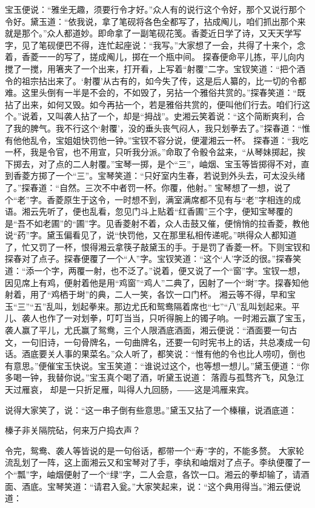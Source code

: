 \documentclass[12pt,oneside]{book}
\begin{document}
宝玉便说：“雅坐无趣，须要行令才好。”众人有的说行这个令好，那个又说行那个令好。黛玉道：“依我说，拿了笔砚将各色全都写了，拈成阄儿，咱们抓出那个来就是那个。”众人都道妙。即命拿了一副笔砚花笺。香菱近日学了诗，又天天学写字，见了笔砚便巴不得，连忙起座说：“我写。”大家想了一会，共得了十来个，念着，香菱一一的写了，搓成阄儿，掷在一个瓶中间。
探春便命平儿拣，平儿向内搅了一搅，用箸夹了一个出来，打开看，上写着“射覆”二字。宝钗笑道：“把个酒令的祖宗拈出来了。‘射覆’从古有的，如今失了传，这是后人纂的，比一切的令都难。这里头倒有一半是不会的，不如毁了，另拈一个雅俗共赏的。”探春笑道：“既拈了出来，如何又毁。如今再拈一个，若是雅俗共赏的，便叫他们行去。咱们行这个。”说着，又叫袭人拈了一个，却是“拇战”。史湘云笑着说：“这个简断爽利，合了我的脾气。我不行这个‘射覆’，没的垂头丧气闷人，我只划拳去了。”探春道：“惟有他他乱令，宝姐姐快罚他一钟。”宝钗不容分说，便灌湘云一杯。
探春道：“我吃一杯，我是令官，也不用宣，只听我分派。”命取了令骰令盆来，“从琴妹掷起，挨下掷去，对了点的二人射覆。”宝琴一掷，是个“三”，岫烟、宝玉等皆掷得不对，直到香菱方掷了一个“三”。宝琴笑道：“只好室内生春，若说到外头去，可太没头绪了。”探春道：“自然。三次不中者罚一杯。你覆，他射。”
宝琴想了一想，说了个“老”字。香菱原生于这令，一时想不到，满室满席都不见有与“老”字相连的成语。湘云先听了，便也乱看，忽见门斗上贴着“红香圃”三个字，便知宝琴覆的是“吾不如老圃”的“圃”字。见香菱射不着，众人击鼓又催，便悄悄的拉香菱，教他说“药”字。黛玉偏看见了，说“快罚他，又在那里私相传递呢。”哄得众人都知道了，忙又罚了一杯，恨得湘云拿筷子敲黛玉的手。于是罚了香菱一杯。下则宝钗和探春对了点子。探春便覆了一个“人”字。宝钗笑道：“这个‘人’字泛的很。”探春笑道：“添一个字，两覆一射，也不泛了。”说着，便又说了一个“窗”字。宝钗一想，因见席上有鸡，便射着他是用“鸡窗”“鸡人”二典了，因射了一个“埘”字。探春知他射着，用了“鸡栖于埘”的典，二人一笑，各饮一口门杯。
湘云等不得，早和宝玉“三”“五”乱叫，划起拳来。那边尤氏和鸳鸯隔着席也“七”“八”乱叫划起来。平儿、袭人也作了一对划拳，叮叮当当，只听得腕上的镯子响。一时湘云赢了宝玉，袭人赢了平儿，尤氏赢了鸳鸯，三个人限酒底酒面，湘云便说：“酒面要一句古文，一句旧诗，一句骨牌名，一句曲牌名，还要一句时宪书上的话，共总凑成一句话。酒底要关人事的果菜名。”众人听了，都笑说：“惟有他的令也比人唠叨，倒也有意思。”便催宝玉快说。宝玉笑道：“谁说过这个，也等想一想儿。”黛玉便道：“你多喝一钟，我替你说。”宝玉真个喝了酒，听黛玉说道：
落霞与孤骛齐飞，风急江天过雁哀，
却是一只折足雁，叫得人九回肠，――这是鸿雁来宾。

说得大家笑了，说：“这一串子倒有些意思。”黛玉又拈了一个榛穰，说酒底道：

榛子非关隔院砧，何来万户捣衣声？

令完，鸳鸯、袭人等皆说的是一句俗话，都带一个“寿”字的，不能多赘。
大家轮流乱划了一阵，这上面湘云又和宝琴对了手，李纨和岫烟对了点子。李纨便覆了一个“瓢”字，岫烟便射了一个“绿”字，二人会意，各饮一口。湘云的拳却输了，请酒面、酒底。宝琴笑道：“请君入瓮。”大家笑起来，说：“这个典用得当。”湘云便说道：
\end{document}
